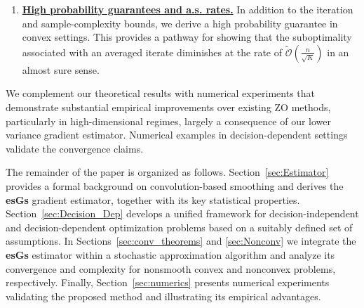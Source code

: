 \documentclass[11pt,reqno]{amsart}
\newcommand{\1}{{\bf 1}}
\newcommand{\2}{{\bf 2}}
\numberwithin{equation}{section}
\theoremstyle{remark}
\begin{document}
\begin{enumerate}[label =\textbf{\Roman*.}, wide, labelwidth=!, labelindent=0pt]
		{In more general nonconvex regimes}, we establish guarantees for finding an $\varepsilon$-approximate stationary point, {providing similar improvements in dimension-dependence in iteration complexity and} matching the best-known dependence on accuracy while improving dimension scaling. 
		\medskip
		\item {\bf \ul{High probability guarantees and a.s. rates.}} In addition to the iteration and sample-complexity bounds, we derive a high probability guarantee in convex settings. This provides a pathway for showing that the suboptimality associated with an averaged iterate diminishes at the rate of $\tilde{\mathcal{O}}(\tfrac{n}{\sqrt{K}})$ in an almost sure sense.
\end{enumerate}		
		\medskip
		We complement our theoretical results with numerical experiments that demonstrate substantial empirical improvements over existing ZO methods, particularly in high-dimensional regimes, {largely a consequence of our lower variance gradient estimator}. {Numerical examples in decision-dependent settings validate the convergence claims.} %
		
		\medskip
		
		The remainder of the paper is organized as follows. Section~\ref{sec:Estimator} provides a formal background on convolution-based smoothing and derives the \textbf{esGs} gradient estimator, together with its key statistical properties. Section~\ref{sec:Decision_Dep} develops a unified framework for decision-independent and decision-dependent optimization problems {based on a suitably defined set of} assumptions. In Sections~\ref{sec:conv_theorems} and \ref{sec:Nonconv} we integrate the \textbf{esGs} estimator within a stochastic approximation algorithm and analyze its convergence and complexity for nonsmooth convex and nonconvex problems, respectively. Finally, Section~\ref{sec:numerics} presents numerical experiments validating the proposed method and illustrating its empirical advantages.\\
		
\end{document}
